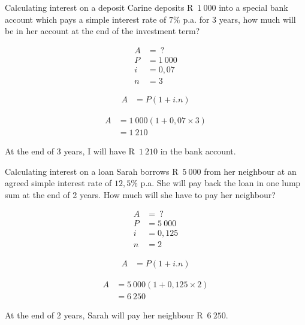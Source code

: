\begin{wex}{Calculating interest on a deposit}{
    Carine deposits R~$1~ 000$ into a special bank account which pays a simple interest rate of $7\%$ p.a. for 3 years, how much will be in her account at the end of the investment term?}{

    \begin{align*}
	A &= ~?\\
	P &= 1~000\\
	i &= 0,07\\
	n &= 3
    \end{align*}
    
    \begin{align*}
	A &= P(1 + i . n)
    \end{align*}

    \begin{align*}
	A &= 1~000(1 + 0,07 \times 3)\\
	  &= 1~210
    \end{align*}

    At the end of 3 years, I will have R~$1~210$ in the bank account.
    }
\end{wex}


\begin{wex}{Calculating interest on a loan}{
    Sarah borrows R~$5~000$ from her neighbour at an agreed simple interest rate of $12,5\%$ p.a. She will pay back the loan in one lump sum at the end of 2 years. How much will she have to pay her neighbour?}{

    \begin{align*}
	A &= ~?\\
	P &= 5~000\\
	i &= 0,125\\
	n &= 2
    \end{align*}

    \begin{align*}
	A &= P(1 + i . n)
    \end{align*}

    \begin{align*}
	A &= 5~000(1 + 0,125 \times 2)\\
	  &= 6~250
    \end{align*}

    At the end of 2 years, Sarah will pay her neighbour R~$6~250$.
    }
\end{wex}


